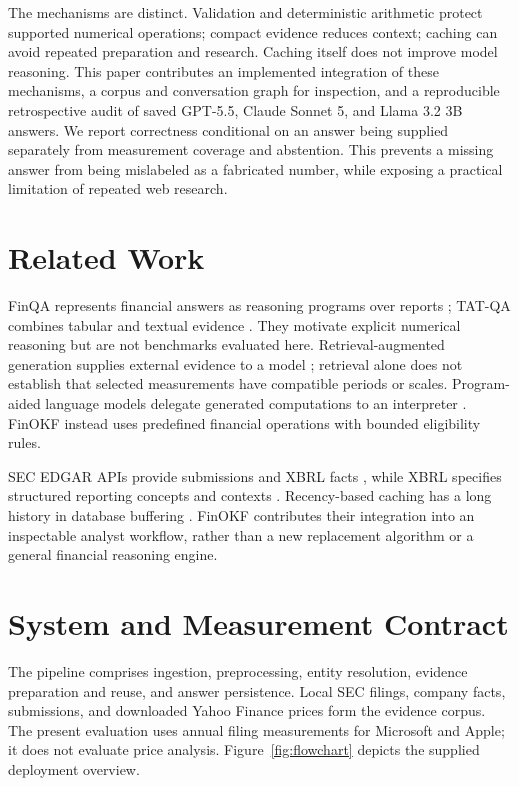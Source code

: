 \documentclass[letterpaper]{article} %
\begin{document}
The mechanisms are distinct. Validation and deterministic arithmetic protect supported numerical operations; compact evidence reduces context; caching can avoid repeated preparation and research. Caching itself does not improve model reasoning. This paper contributes an implemented integration of these mechanisms, a corpus and conversation graph for inspection, and a reproducible retrospective audit of saved GPT-5.5, Claude Sonnet 5, and Llama 3.2 3B answers. We report correctness conditional on an answer being supplied separately from measurement coverage and abstention. This prevents a missing answer from being mislabeled as a fabricated number, while exposing a practical limitation of repeated web research.

\section{Related Work}
FinQA represents financial answers as reasoning programs over reports \citep{chen2021finqa}; TAT-QA combines tabular and textual evidence \citep{zhu2021tatqa}. They motivate explicit numerical reasoning but are not benchmarks evaluated here. Retrieval-augmented generation supplies external evidence to a model \citep{lewis2020rag}; retrieval alone does not establish that selected measurements have compatible periods or scales. Program-aided language models delegate generated computations to an interpreter \citep{gao2023pal}. FinOKF instead uses predefined financial operations with bounded eligibility rules.

SEC EDGAR APIs provide submissions and XBRL facts \citep{secapi}, while XBRL specifies structured reporting concepts and contexts \citep{xbrl2026standard}. Recency-based caching has a long history in database buffering \citep{oneil1993lruk}. FinOKF contributes their integration into an inspectable analyst workflow, rather than a new replacement algorithm or a general financial reasoning engine.

\section{System and Measurement Contract}
The pipeline comprises ingestion, preprocessing, entity resolution, evidence preparation and reuse, and answer persistence. Local SEC filings, company facts, submissions, and downloaded Yahoo Finance prices form the evidence corpus. The present evaluation uses annual filing measurements for Microsoft and Apple; it does not evaluate price analysis. Figure~\ref{fig:flowchart} depicts the supplied deployment overview.
\end{document}
